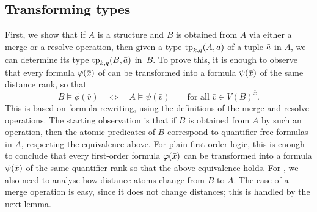 \subsection{Transforming types}
\label{sec:trans-tp}
First,
we show that if $A$ is a structure
and $B$ is obtained from $A$ via either a merge or a resolve operation,
then given a type $\textnormal{tp}_{k,q}(A,\bar a)$ of a tuple $\bar a$ in $A$, we can determine
its type $\textnormal{tp}_{k,q}(B,\bar a)$ in~$B$.
To prove this, it is enough to observe that
every formula $\varphi(\bar x)$ of \distFO can be transformed into a formula $\psi(\bar x)$
of the same distance rank, so that
\[B \models \phi(\bar v)\quad\iff\quad A \models \psi(\bar v)\qquad \text{for all }\bar v\in V(B)^{\bar x}.\]
This is based on formula rewriting, using the definitions of the merge and resolve operations.
The starting observation is that if $B$ is obtained from $A$ by such an operation, then the atomic predicates of $B$ correspond to quantifier-free formulas in $A$, respecting the equivalence above.
For plain first-order logic, this is enough to conclude that every first-order formula $\varphi(\bar x)$ can be transformed into a formula $\psi(\bar x)$ of the same quantifier rank so that the above equivalence holds.
For \distFO, we also need to analyse how  distance atoms change from $B$ to $A$.
The case of a merge operation is easy, since it does not change distances;
this is handled by the next lemma.



